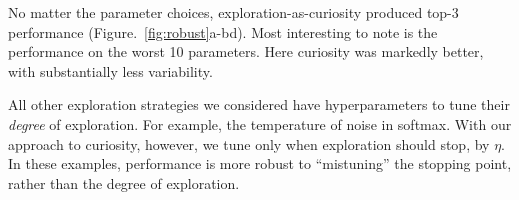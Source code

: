 No matter the parameter choices, exploration-as-curiosity produced top-3 performance (Figure.~\ref{fig:robust}a-bd). Most interesting to note is the performance on the worst 10 parameters. Here curiosity was markedly better, with substantially less variability.

All other exploration strategies we considered have hyperparameters to tune their \emph{degree} of exploration. For example, the temperature of noise in softmax. With our approach to curiosity, however, we tune only when exploration should stop, by $\eta$. In these examples, performance is more robust to  ``mistuning'' the stopping point, rather than the degree of exploration.
